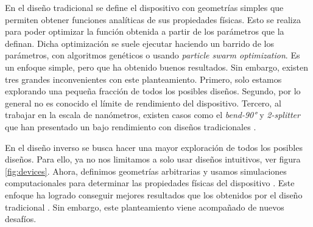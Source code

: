 En el diseño tradicional se define el dispositivo con geometrías simples que permiten obtener funciones analíticas de sus propiedades físicas. 
Esto se realiza para poder optimizar la función obtenida a partir de los parámetros que la definan. 
Dicha optimización se suele ejecutar haciendo un barrido de los parámetros, con algoritmos genéticos o usando \emph{particle swarm optimization}. 
Es un enfoque simple, pero que ha obtenido buenos resultados. 
Sin embargo, existen tres grandes inconvenientes con este planteamiento. 
Primero, solo estamos explorando una pequeña fracción de todos los posibles diseños.
Segundo, por lo general no es conocido el límite de rendimiento del dispositivo.
Tercero, al trabajar en la escala de nanómetros, existen casos como el \emph{bend-90°} y \emph{2-splitter} que han presentado un bajo rendimiento con diseños tradicionales \citep{Molesky2018, Su2020}.


En el diseño inverso se busca hacer una mayor exploración de todos los posibles diseños. 
Para ello, ya no nos limitamos a solo usar diseños intuitivos, ver figura \ref{fig:devices}. Ahora, definimos geometrías arbitrarias y usamos simulaciones computacionales para determinar las propiedades físicas del dispositivo \citep{Molesky2018, Su2020}. Este enfoque ha logrado conseguir mejores resultados que los obtenidos por el diseño tradicional \citep{Su2018, Molesky2018}. Sin embargo, este planteamiento viene acompañado de nuevos desafíos.


